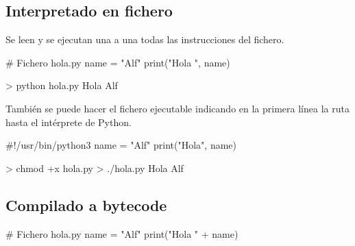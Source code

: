 \documentclass[
  spanish,
  a4paper,
]{scrreport}
\newenvironment{Shaded}{\begin{snugshade}}{\end{snugshade}}
\newcommand{\BuiltInTok}[1]{\textcolor[rgb]{0.00,0.23,0.31}{#1}}
\newcommand{\CommentTok}[1]{\textcolor[rgb]{0.37,0.37,0.37}{#1}}
\newcommand{\ExtensionTok}[1]{\textcolor[rgb]{0.00,0.23,0.31}{#1}}
\newcommand{\NormalTok}[1]{\textcolor[rgb]{0.00,0.23,0.31}{#1}}
\newcommand{\OperatorTok}[1]{\textcolor[rgb]{0.37,0.37,0.37}{#1}}
\newcommand{\StringTok}[1]{\textcolor[rgb]{0.13,0.47,0.30}{#1}}
\begin{document}
\subsection{Interpretado en fichero}\label{interpretado-en-fichero}

Se leen y se ejecutan una a una todas las instrucciones del fichero.

\begin{Shaded}
\begin{Highlighting}[]
\CommentTok{\# Fichero hola.py}
\NormalTok{name }\OperatorTok{=} \StringTok{"Alf"}
\BuiltInTok{print}\NormalTok{(}\StringTok{"Hola "}\NormalTok{, name)}
\end{Highlighting}
\end{Shaded}

\begin{Shaded}
\begin{Highlighting}[]
\OperatorTok{\textgreater{}}\NormalTok{ python }\ExtensionTok{hola.py}
\ExtensionTok{Hola}\NormalTok{ Alf}
\end{Highlighting}
\end{Shaded}

También se puede hacer el fichero ejecutable indicando en la primera
línea la ruta hasta el intérprete de Python.

\begin{Shaded}
\begin{Highlighting}[]
\CommentTok{\#!/usr/bin/python3}
\NormalTok{name }\OperatorTok{=} \StringTok{"Alf"}
\BuiltInTok{print}\NormalTok{(}\StringTok{"Hola"}\NormalTok{, name)}
\end{Highlighting}
\end{Shaded}

\begin{Shaded}
\begin{Highlighting}[]
\OperatorTok{\textgreater{}}\NormalTok{ chmod }\ExtensionTok{+x}\NormalTok{ hola.py}
\OperatorTok{\textgreater{}}\NormalTok{ ./hola.py}
\ExtensionTok{Hola}\NormalTok{ Alf}
\end{Highlighting}
\end{Shaded}

\subsection{Compilado a bytecode}\label{compilado-a-bytecode}

\begin{Shaded}
\begin{Highlighting}[]
\CommentTok{\# Fichero hola.py}
\NormalTok{name }\OperatorTok{=} \StringTok{"Alf"}
\BuiltInTok{print}\NormalTok{(}\StringTok{"Hola "} \OperatorTok{+}\NormalTok{ name)}
\end{Highlighting}
\end{Shaded}
\end{document}
